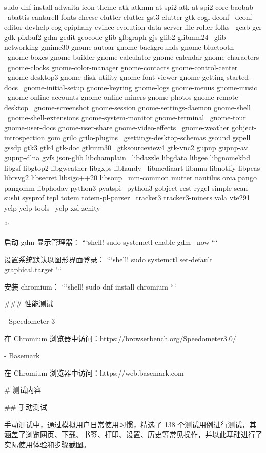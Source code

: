 \documentclass{article}
\begin{document}
\begin{markdown}
sudo dnf install adwaita-icon-theme atk atkmm at-spi2-atk at-spi2-core baobab \
 abattis-cantarell-fonts cheese clutter clutter-gst3 clutter-gtk cogl dconf \
 dconf-editor devhelp eog epiphany evince evolution-data-server file-roller folks \
 gcab gcr gdk-pixbuf2 gdm gedit geocode-glib gfbgraph gjs glib2 glibmm24 \
 glib-networking gmime30 gnome-autoar gnome-backgrounds gnome-bluetooth \
 gnome-boxes gnome-builder gnome-calculator gnome-calendar gnome-characters \
 gnome-clocks gnome-color-manager gnome-contacts gnome-control-center \
 gnome-desktop3 gnome-disk-utility gnome-font-viewer gnome-getting-started-docs \
 gnome-initial-setup gnome-keyring gnome-logs gnome-menus gnome-music \
 gnome-online-accounts gnome-online-miners gnome-photos gnome-remote-desktop \
 gnome-screenshot gnome-session gnome-settings-daemon gnome-shell \
 gnome-shell-extensions gnome-system-monitor gnome-terminal \
 gnome-tour gnome-user-docs gnome-user-share gnome-video-effects \
 gnome-weather gobject-introspection gom grilo grilo-plugins \
 gsettings-desktop-schemas gsound gspell gssdp gtk3 gtk4 gtk-doc gtkmm30 \
 gtksourceview4 gtk-vnc2 gupnp gupnp-av gupnp-dlna gvfs json-glib libchamplain \
 libdazzle libgdata libgee libgnomekbd libgsf libgtop2 libgweather libgxps libhandy \
 libmediaart libnma libnotify libpeas librsvg2 libsecret libsigc++20 libsoup \
 mm-common mutter nautilus orca pango pangomm libphodav python3-pyatspi \
 python3-gobject rest rygel simple-scan sushi sysprof tepl totem totem-pl-parser \
 tracker3 tracker3-miners vala vte291 yelp yelp-tools \
 yelp-xsl zenity

```

启动 gdm 显示管理器：
```shell!
sudo systemctl enable gdm --now
```

设置系统默认以图形界面登录：
```shell!
sudo systemctl set-default graphical.target
```

安装 chromium：
```shell!
sudo dnf install chromium
```

### 性能测试

- Speedometer 3

在 Chromium 浏览器中访问：https://browserbench.org/Speedometer3.0/

- Basemark

在 Chromium 浏览器中访问：https://web.basemark.com

# 测试内容

## 手动测试

手动测试中，通过模拟用户日常使用习惯，精选了 138 个测试用例进行测试，其涵盖了浏览网页、下载、书签、打印、设置、历史等常见操作，并以此基础进行了实际使用体验和步骤截图。


\end{markdown}
\end{document}
